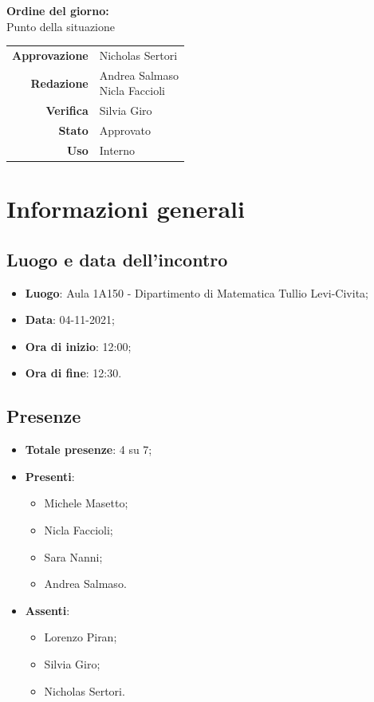 \documentclass[11pt]{article}
\begin{document}
\begin{titlepage}
\begin{center}
			\large
			
			\vfill
			\textbf{Ordine del giorno:} \\
			Punto della situazione
			\vfill
			
			\begin{tabular}{r|l}
				\textbf{Approvazione} &  Nicholas Sertori\\
				\textbf{Redazione} &  \parbox[t]{3.5cm}{Andrea Salmaso \\Nicla Faccioli}\\
				\textbf{Verifica} &  Silvia Giro\\
				\textbf{Stato} & Approvato \\
				\textbf{Uso} & Interno
			\end{tabular}
			\vfill
			
		\end{center}
	\end{titlepage}

	\newpage

	\section{Informazioni generali}
	\subsection{Luogo e data dell'incontro}
	\begin{itemize}
		\item \textbf{Luogo}: Aula 1A150 - Dipartimento di Matematica Tullio Levi-Civita;
		\item \textbf{Data}: 04-11-2021;
		\item \textbf{Ora di inizio}: 12:00;
		\item \textbf{Ora di fine}: 12:30.
	\end{itemize}
	
	\subsection{Presenze}
	\begin{itemize}
		\item \textbf{Totale presenze}: 4 su 7;
		\item \textbf{Presenti}:
		\begin{itemize}  
			\item Michele Masetto;
			\item Nicla Faccioli;
			\item Sara Nanni;
			\item Andrea Salmaso.
		\end{itemize}
		\item \textbf{Assenti}:
			\begin{itemize}
				\item Lorenzo Piran;
				\item Silvia Giro;
				\item Nicholas Sertori.
			\end{itemize}
	\end{itemize}
\end{document}
